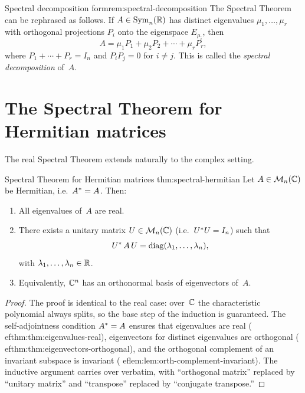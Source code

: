 \begin{remark}{Spectral decomposition form}{rem:spectral-decomposition}
The Spectral Theorem can be rephrased as follows.  If $A\in\operatorname{Sym}_n({\mathbb{R}})$
has distinct eigenvalues $\mu_1,\ldots,\mu_r$ with orthogonal projections
$P_i$ onto the eigenspace $E_{\mu_i}$, then
\[
  A = \mu_1 P_1 + \mu_2 P_2 + \cdots + \mu_r P_r,
\]
where $P_1 + \cdots + P_r = I_n$ and $P_i P_j = 0$ for $i\neq j$.
This is called the \emph{spectral decomposition}
of~$A$.
\end{remark}


\section{The Spectral Theorem for Hermitian matrices}%
\label{sec:spectral-hermitian}

The real Spectral Theorem extends naturally to the complex setting.

\begin{theorem}{Spectral Theorem for Hermitian matrices}%
{thm:spectral-hermitian}
Let $A\in\mathcal{M}_n({\mathbb{C}})$ be Hermitian, i.e.\ ${A}^{*}=A$.  Then:
\begin{enumerate}[label=\textup{(\roman*)}]
  \item All eigenvalues of~$A$ are real.
  \item There exists a unitary matrix $U\in\mathcal{M}_n({\mathbb{C}})$
    (i.e.\ ${U}^{*}U = I_n$) such that
    \[
      {U}^{*}\,A\,U = \operatorname{diag}(\lambda_1,\ldots,\lambda_n),
    \]
    with $\lambda_1,\ldots,\lambda_n\in{\mathbb{R}}$.
  \item Equivalently, ${\mathbb{C}}^n$ has an orthonormal basis of eigenvectors
    of~$A$.
\end{enumerate}
\end{theorem}

\begin{proof}
The proof is identical to the real case: over~${\mathbb{C}}$ the characteristic
polynomial always splits, so the base step of the induction is
guaranteed.  The self-adjointness condition ${A}^{*}=A$ ensures that
eigenvalues are real (
ef{thm:thm:eigenvalues-real}), eigenvectors for
distinct eigenvalues are orthogonal
(
ef{thm:thm:eigenvectors-orthogonal}), and the orthogonal complement
of an invariant subspace is invariant
(
ef{lem:lem:orth-complement-invariant}).  The inductive argument carries
over verbatim, with ``orthogonal matrix'' replaced by ``unitary matrix''
and ``transpose'' replaced by ``conjugate transpose.''
\end{proof}


